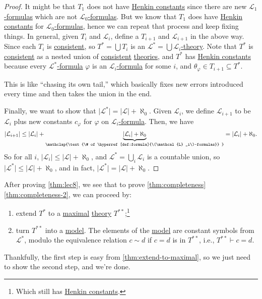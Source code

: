 \begin{proof}
	It might be that \(T_1\) does not have \hyperref[def:Henkin-constant]{Henkin constants} since there are new \hyperref[def:formula]{\(\mathcal{L} _1\)-formulas} which are not \hyperref[def:formula]{\(\mathcal{L} _0\)-formulas}. But we know that \(T_1\) does have \hyperref[def:Henkin-constant]{Henkin constants} for \hyperref[def:formula]{\(\mathcal{L} _0\)-formulas}, hence we can repeat that process and keep fixing things. In general, given \(T_{i} \) and \(\mathcal{L} _i\), define a \(T_{i+1}\) and \(\mathcal{L} _{i+1}\) in the above way. Since each \(T_i\) is \hyperref[def:consistent]{consistent}, so \(T^{\ast} = \bigcup T_i\) is an \hyperref[def:theory]{\(\mathcal{L} ^{\ast} = \bigcup \mathcal{L} _i\)-theory}. Note that \(T^{\ast} \) is \hyperref[def:consistent]{consistent} as a nested union of \hyperref[def:consistent]{consistent} \hyperref[def:theory]{theories}, and \(T^{\ast} \) has \hyperref[def:Henkin-constant]{Henkin constants} because every \hyperref[def:formula]{\(\mathcal{L} ^{\ast} \)-formula} \(\varphi \) is an \hyperref[def:formula]{\(\mathcal{L} _i\)-formula} for some \(i\), and \(\theta _\varphi \in T_{i+1} \subseteq T^{\ast} \).

	\begin{intuition}
		This is like ``chasing its own tail,'' which basically fixes new errors introduced every time and then takes the union in the end.
	\end{intuition}

	Finally, we want to show that \(\vert \mathcal{L} ^{\ast} \vert = \vert \mathcal{L} \vert + \aleph _0\). Given \(\mathcal{L} _i\), we define \(\mathcal{L} _{i+1}\) to be \(\mathcal{L} _i\) plus new constants \(c_\varphi \) for \(\varphi \) on \hyperref[def:formula]{\(\mathcal{L} _i\)-formula}. Then, we have
	\[
		\vert \mathcal{L} _{i+1} \vert
		\leq \vert \mathcal{L} _i \vert + \underbrace{\vert \mathcal{L} _i \vert + \aleph_0}_{\mathclap{\text{\# of \hyperref[def:formula]{\(\mathcal{L} _i\)-formulas}} }}
		= \vert \mathcal{L} _i \vert + \aleph_0.
	\]
	So for all \(i\), \(\vert \mathcal{L} _i \vert \leq \vert \mathcal{L}  \vert + \aleph_0\), and \(\mathcal{L} ^{\ast} = \bigcup_{i} \mathcal{L} _i\) is a countable union, so \(\vert \mathcal{L} ^{\ast} \vert \leq \vert \mathcal{L}  \vert + \aleph_0\), and in fact, \(\vert \mathcal{L} ^{\ast}  \vert = \vert \mathcal{L}  \vert + \aleph_0\).
\end{proof}

After proving \autoref{thm:lec8}, we see that to prove \autoref{thm:completeness} \autoref{thm:completeness-2}, we can proceed by:
\begin{enumerate}
	\item extend \(T^{\ast} \) to a \hyperref[def:maximal]{maximal} \hyperref[def:theory]{theory} \(T^{\ast\ast} \);\footnote{Which still has \hyperref[def:Henkin-constant]{Henkin constants}.}
	\item turn \(T^{\ast\ast} \) into a \hyperref[def:model]{model}. The elements of the \hyperref[def:model]{model} are constant symbols from \(\mathcal{L} ^{\ast} \), modulo the equivalence relation \(c \sim d\) if \(c=d\) is in \(T^{\ast\ast} \), i.e., \(T^{\ast\ast} \vdash c = d\).
\end{enumerate}

Thankfully, the first step is easy from \autoref{thm:extend-to-maximal}, so we just need to show the second step, and we're done.